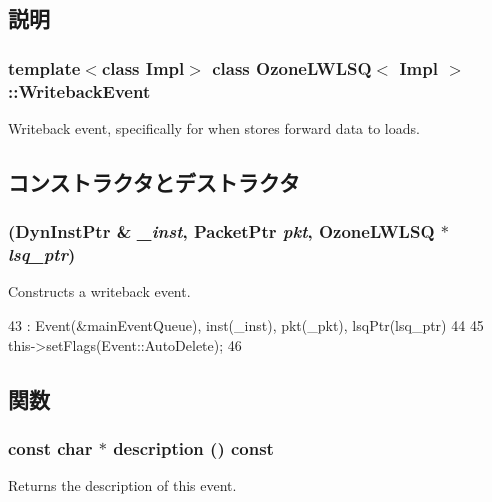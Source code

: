\subsection{説明}
\subsubsection*{template$<$class Impl$>$ class OzoneLWLSQ$<$ Impl $>$::WritebackEvent}

Writeback event, specifically for when stores forward data to loads. 

\subsection{コンストラクタとデストラクタ}
\hypertarget{classOzoneLWLSQ_1_1WritebackEvent_a4de731bd611fafa473682bcfce09134c}{
\subsubsection[{WritebackEvent}]{ ({\bf DynInstPtr} \& {\em \_\-inst}, \/  {\bf PacketPtr} {\em pkt}, \/  {\bf OzoneLWLSQ} $\ast$ {\em lsq\_\-ptr})}}
\label{classOzoneLWLSQ_1_1WritebackEvent_a4de731bd611fafa473682bcfce09134c}
Constructs a writeback event. 


\begin{DoxyCode}
43     : Event(&mainEventQueue), inst(_inst), pkt(_pkt), lsqPtr(lsq_ptr)
44 {
45     this->setFlags(Event::AutoDelete);
46 }
\end{DoxyCode}


\subsection{関数}
\hypertarget{classOzoneLWLSQ_1_1WritebackEvent_a5a14fe478e2393ff51f02e9b7be27e00}{
\subsubsection[{description}]{\setlength{\rightskip}{0pt plus 5cm}const char $\ast$ description () const}}
\label{classOzoneLWLSQ_1_1WritebackEvent_a5a14fe478e2393ff51f02e9b7be27e00}
Returns the description of this event. 

